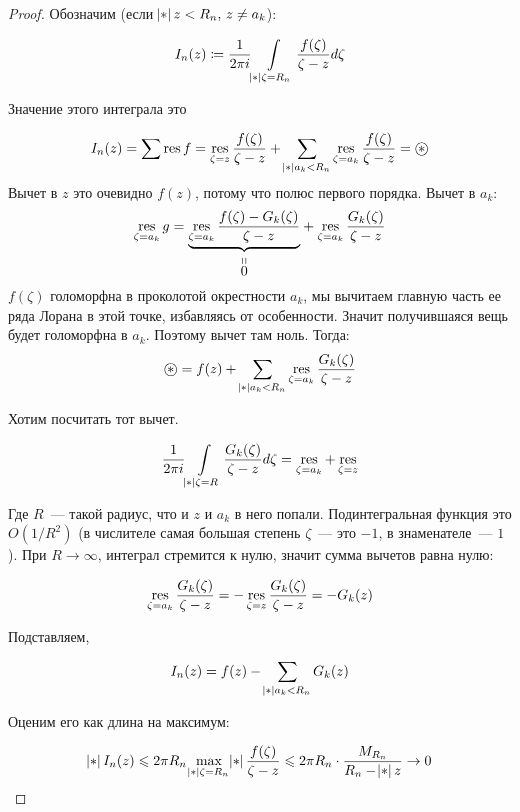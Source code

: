\begin{proof}
    Обозначим (если $\abs{z} < R_n, \, z \neq a_k$):

    \[
        I_n(z) \coloneqq \frac{1}{2\pi i}
        \int\limits_{\abs{\zeta} = R_n} \frac{f(\zeta)}{\zeta - z}d\zeta
    \]

    Значение этого интеграла это

    \[
        I_n(z) = \sum\res f =
        \res\limits_{\zeta=z} \frac{f(\zeta)}{\zeta-z}
        + \sum\limits_{\abs{a_k}<R_n} \res\limits_{\zeta=a_k} \frac{f(\zeta)}{\zeta - z}
        = \oast 
    \]
    Вычет в $z$ это очевидно $f(z)$, потому что полюс первого порядка. Вычет в $a_k$:  
    \begin{gather*}
        \res\limits_{\zeta=a_k} g = \stackbelow{\underbrace{\res\limits_{\zeta=a_k} \frac{f(\zeta) - G_k(\zeta)}{\zeta - z}}}{0} + \res\limits_{\zeta=a_k} \frac{G_k(\zeta)}{\zeta - z}
    \end{gather*}
    $f(\zeta)$ голоморфна в проколотой окрестности $a_k$, мы вычитаем главную часть ее ряда Лорана в этой точке, избавляясь от особенности. Значит получившаяся вещь будет голоморфна в $a_k$. Поэтому вычет там ноль. 
    Тогда: 
    \begin{gather*}
        \oast = f(z) +\sum\limits_{\abs{a_k}<R_n} \res\limits_{\zeta=a_k} \frac{G_k(\zeta)}{\zeta - z}
    \end{gather*}

    Хотим посчитать тот вычет.

    \[
        \frac{1}{2\pi i} \int\limits_{\abs{\zeta} = R}
        \frac{G_k(\zeta)}{\zeta - z} d\zeta
        = \res\limits_{\zeta = a_k} + \res\limits_{\zeta = z}
    \]

    Где $R$~--- такой радиус, что и $z$ и $a_k$ в него попали.
    Подинтегральная функция это $O(1/R^2)$ (в числителе самая большая
    степень $\zeta$~--- это $-1$, в знаменателе~--- $1$).
    При $R\to\infty$, интеграл стремится к нулю, значит сумма
    вычетов равна нулю:

    \[
        \res\limits_{\zeta=a_k} \frac{G_k(\zeta)}{\zeta - z}
        = -\res\limits_{\zeta=z} \frac{G_k(\zeta)}{\zeta - z}
        = -G_k(z)
    \]

    Подставляем,

    \[
        I_n(z) = f(z) - \sum\limits_{\abs{a_k} < R_n} G_k(z)
    \]

    Оценим его как длина на максимум:

    \[
        \abs{I_n(z)} \le 2\pi R_n \max_{\abs\zeta = R_n}
        \abs{\frac{f(\zeta)}{\zeta - z}} \le
        2\pi R_n \cdot \frac{M_{R_n}}{R_n-\abs{z}} \to 0
    \]
\end{proof}

\newpage
